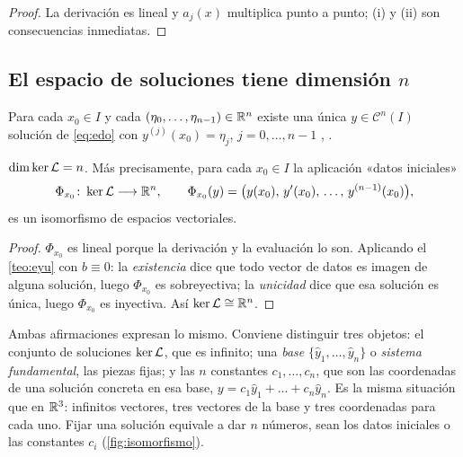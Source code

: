 \begin{proof}
La derivación es lineal y $a_j(x)$ multiplica punto a punto; (i) y (ii)
son consecuencias inmediatas.
\end{proof}

\subsection{El espacio de soluciones tiene dimensión \texorpdfstring{$n$}{n}}\label{sec:dimension}

\begin{teorema}\label{teo:eyu}
Para cada $x_0\in I$ y cada $(\eta_0,\dots,\eta_{n-1})\in\mathbb{R}^{n}$ existe una
única $y\in\mathcal C^{n}(I)$ solución de \eqref{eq:edo} con
$y^{(j)}(x_0)=\eta_j$, $j=0,\dots,n-1$
\textup{\cite[cap.~3]{CODDINGTON}, \cite[cap.~IV]{TEMARIO}}.
\end{teorema}

\begin{teorema}\label{teo:dimension}
$\dim\operatorname{ker}\mathcal{L}=n$. Más precisamente, para cada $x_0\in I$ la aplicación
«datos iniciales»
\begin{equation}\label{eq:Phi}
  \Phi_{x_0}\colon\operatorname{ker}\mathcal{L}\longrightarrow\mathbb{R}^{n},\qquad
  \Phi_{x_0}(y)=\bigl(y(x_0),\,y'(x_0),\,\dots,\,y^{(n-1)}(x_0)\bigr),
\end{equation}
es un isomorfismo de espacios vectoriales.
\end{teorema}

\begin{proof}
$\Phi_{x_0}$ es lineal porque la derivación y la evaluación lo son. Aplicando
el \cref{teo:eyu} con $b\equiv0$: la \emph{existencia} dice que todo vector
de datos es imagen de alguna solución, luego $\Phi_{x_0}$ es sobreyectiva;
la \emph{unicidad} dice que esa solución es única, luego $\Phi_{x_0}$ es
inyectiva. Así $\operatorname{ker}\mathcal{L}\cong\mathbb{R}^{n}$.
\end{proof}

\begin{observacion}\label{obs:n-constantes}
Ambas afirmaciones expresan lo mismo. Conviene distinguir tres objetos: el
conjunto de soluciones $\operatorname{ker}\mathcal{L}$, que es infinito; una \emph{base}
$\{\hat y_1,\dots,\hat y_n\}$ o \emph{sistema fundamental}, las piezas
fijas; y las $n$ constantes $c_1,\dots,c_n$, que son las coordenadas de una
solución concreta en esa base, $y=c_1\hat y_1+\dots+c_n\hat y_n$. Es la misma
situación que en $\mathbb{R}^{3}$: infinitos vectores, tres vectores de la base y
tres coordenadas para cada uno. Fijar una solución equivale a dar $n$
números, sean los datos iniciales o las constantes $c_i$
(\cref{fig:isomorfismo}).
\end{observacion}

